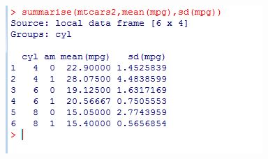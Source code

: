 \documentclass{beamer}
\begin{document}
\begin{frame}
\begin{figure}
\centering
\includegraphics[width=1.1\linewidth]{mtcarssummarise}
\label{fig:mtcarssummarise}
\end{figure}
\end{frame}
		
\end{document}
